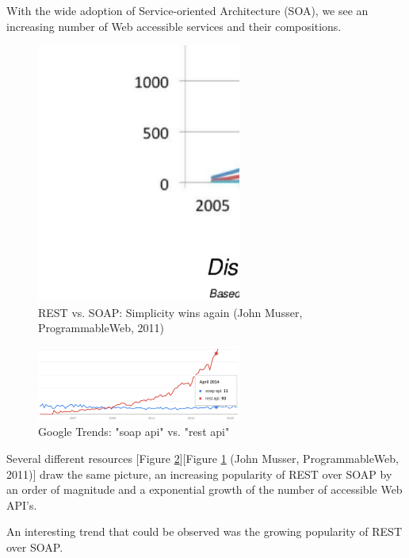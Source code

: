 With the wide adoption of Service-oriented Architecture (SOA), we see an increasing number of Web accessible services and their compositions.~\cite{conf/icws/HuangFT12}
\begin{figure}[!ht]
	\centering
  \includegraphics[width=0.6\textwidth]{figures/slide-11-1024}
	\caption{REST vs. SOAP: Simplicity wins again (John Musser, ProgrammableWeb, 2011)}
	\label{fig:slide-11-1024}
\end{figure}

\begin{figure}[!ht]
  \centering
  \includegraphics[width=0.6\textwidth]{figures/googleTrends_Rest-SOAP}
  \caption{Google Trends: "soap api" vs. "rest api"}
  \label{fig:googleTrends_Rest-SOAP}
\end{figure}
Several different resources [Figure \ref{fig:googleTrends_Rest-SOAP}][Figure \ref{fig:slide-11-1024} (John Musser, ProgrammableWeb, 2011)] draw the same picture, an increasing popularity of REST over SOAP by an order of magnitude and a exponential growth of the number of accessible Web API's.

An interesting trend that could be observed was the growing popularity of REST over SOAP.~\cite{ploscar2012xml}

